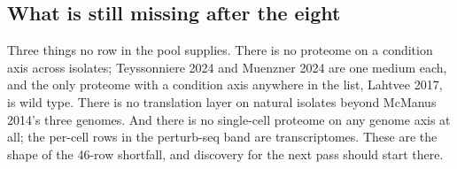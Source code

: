 \subsection{What is still missing after the eight}\label{sec:state-gaps}

Three things no row in the pool supplies. There is no proteome on a condition axis across
isolates; Teyssonniere 2024 and Muenzner 2024 are one medium each, and the only proteome
with a condition axis anywhere in the list, Lahtvee 2017, is wild type. There is no
translation layer on natural isolates beyond McManus 2014's three genomes. And there is no
single-cell proteome on any genome axis at all; the per-cell rows in the perturb-seq band
are transcriptomes. These are the shape of the 46-row shortfall, and discovery for the next
pass should start there.
